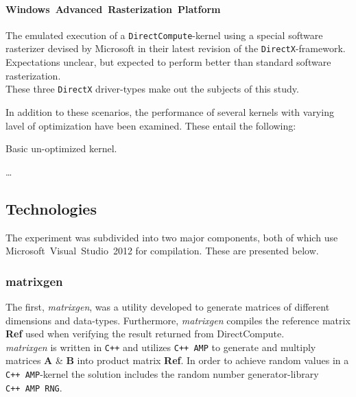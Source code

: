 \documentclass[fleqn,10pt]{SelfArx} %
\begin{document}
\paragraph{Windows~Advanced~Rasterization~Platform}
	The emulated execution of a \texttt{DirectCompute}-kernel using a special software rasterizer devised by Microsoft in their latest revision of the \texttt{DirectX}-framework.\\	
	Expectations unclear, but expected to perform better than standard software rasterization.\\

\noindent
These three \texttt{DirectX} driver-types make out the subjects of this study.

In addition to these scenarios, the performance of several kernels with varying lavel of optimization have been examined. These entail the following:
\begin{enumerate*}
	\item Basic un-optimized kernel.
	\item \ldots
\end{enumerate*}



\subsection{Technologies}
\label{sec:contribution:technologies}
The experiment was subdivided into two major components, both of which use Microsoft~Visual~Studio~2012 for compilation. These are presented below.

\subsubsection*{matrixgen}
The first, \textit{matrixgen},  was a utility developed to generate matrices of different dimensions and data-types. Furthermore, \textit{matrixgen} compiles the reference matrix \textbf{Ref} used when verifying the result returned from DirectCompute. \\
\textit{matrixgen} is written in \texttt{C++} and utilizes \texttt{C++~AMP} to generate and multiply matrices \textbf{A} \& \textbf{B} into product matrix \textbf{Ref}. In order to achieve random values in a \texttt{C++~AMP}-kernel the solution includes the random number generator-library \texttt{C++~AMP~RNG}.
\end{document}

